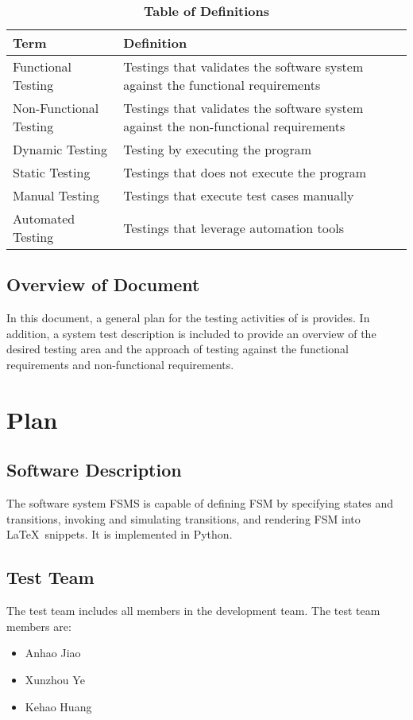 \documentclass[12pt, titlepage]{article}
\begin{document}
\begin{table}[!htbp]
\caption{\textbf{Table of Definitions}} \label{Table}

\begin{tabularx}{\textwidth}{p{3cm}X}
\toprule
\textbf{Term} & \textbf{Definition}\\
\midrule
  Functional Testing & Testings that validates the software system against the
                       functional requirements\\
  Non-Functional Testing & Testings that validates the software system against
                           the non-functional requirements \\
Dynamic Testing & Testing by executing the program\\
  Static Testing & Testings that does not execute the program\\
  Manual Testing & Testings that execute test cases manually\\
  Automated Testing & Testings that leverage automation tools\\
\bottomrule
\end{tabularx}

\end{table}	

\subsection{Overview of Document}
In this document, a general plan for the testing activities of is provides. In
addition, a system test description is included to provide an overview of the
desired testing area and the approach of testing against the functional
requirements and non-functional requirements.
\section{Plan}
\subsection{Software Description}
The software system FSMS is capable of defining FSM by specifying states and
transitions, invoking and simulating transitions, and rendering FSM into \LaTeX\
snippets. It is implemented in Python.
\subsection{Test Team}
The test team includes all members in the development team. The test team
members are:
\begin{itemize}
\item Anhao Jiao
\item Xunzhou Ye
\item Kehao Huang
\end{itemize}
\end{document}

